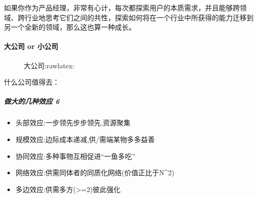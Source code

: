 \documentclass[letterpaper,11pt,english]{sphinxmanual}
\begin{document}
如果你作为产品经理，非常有心计，每次都探索用户的本质需求，并且能够跨领域、跨行业地思考它们之间的共性，探索如何将在一个行业中所获得的能力迁移到另一个全新的领域，那么这也算一种成长。


\paragraph{大公司 or 小公司}
\label{\detokenize{chapter_interview/choose:or}}
\begin{figure}[H]
\centering
\capstart

\noindent{}
\caption{大公司:raw\sphinxhyphen{}latex:}\label{\detokenize{chapter_interview/choose:id10}}\end{figure}

什么公司值得去：


\subparagraph{做大的几种效应 6\sphinxfootnotemark[759]}
\label{\detokenize{chapter_interview/choose:id8}}%
\begin{footnotetext}[759]\sphinxAtStartFootnote
{}
%
\end{footnotetext}\ignorespaces \begin{itemize}
\item {} 
头部效应:一步领先步步领先,资源聚集

\item {} 
规模效应:边际成本递减,供/需端某物多多益善

\item {} 
协同效应:多种事物互相促进“一鱼多吃”

\item {} 
网络效应:供需同体者的同质化网络(价值正比于N\textasciicircum{}2)

\item {} 
多边效应:供需多方(>=2)彼此强化

\end{itemize}
\end{document}
